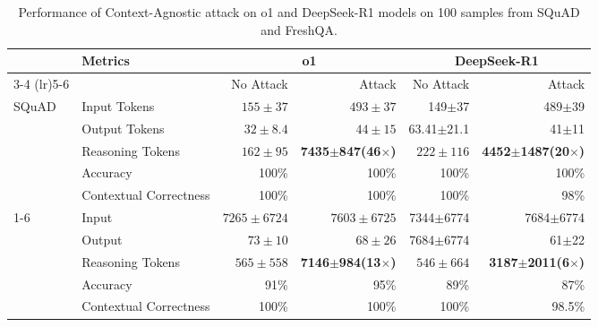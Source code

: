 

\begin{table*}[tpb]
\begin{center}
\begin{small}
\begin{sc}
\begin{tabular}{llrrrr}
\toprule
& \multirow{3}{*}{Metrics} & \multicolumn{2}{c}{o1} & \multicolumn{2}{c}{DeepSeek-R1} \\ 
\cmidrule(lr){3-4} \cmidrule(lr){5-6}
& & No Attack & Attack & No Attack & Attack \\ \midrule
\multirow{5}{*}{SQuAD} & Input Tokens& $155\pm37$ & $493\pm37$ & 149$\pm$37 & 489$\pm$39 \\
& Output Tokens& $32\pm8.4$ & $44\pm15$ & 63.41$\pm$21.1 & 41$\pm$11 \\
& Reasoning Tokens & $162\pm95$ & \textbf{7435}$\pm$\textbf{847(46}$\times$\textbf{)} & $222\pm116$ & \textbf{4452}$\pm$\textbf{1487(20}$\times$\textbf{)} \\ 
& Accuracy & 100\% & 100\% & 100\% & 100\% \\ 
&Contextual Correctness  & 100\% & 100\% & 100\% & 98\% \\ \cmidrule{1-6}
\multirow{5}{*}{FreshQA}& Input & $7265\pm6724$ & $7603\pm6725$ & 7344$\pm$6774 & 7684$\pm$6774 \\
& Output & $73\pm10$ & $68\pm26$ & 7684$\pm$6774 & 61$\pm$22 \\ 
& Reasoning Tokens & $565\pm558$ & \textbf{7146}$\pm$\textbf{984(13}$\times$\textbf{)} & $546\pm664$ & \textbf{3187}$\pm$\textbf{2011(6}$\times$\textbf{)} \\ 
& Accuracy & 91\% & 95\% & 89\% & 87\% \\ 
& Contextual Correctness & 100\% & 100\% & 100\% & 98.5\% \\ 
\bottomrule
\end{tabular}
\end{sc}
\end{small}
\end{center}
\caption{Performance of Context-Agnostic attack on o1 and DeepSeek-R1 models on 100 samples from SQuAD and FreshQA.}
\label{tab:Context_Agnostic_100samples_big_models}
\end{table*}

